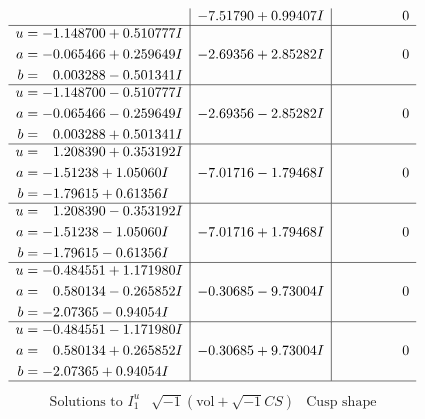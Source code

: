 \documentclass[1p]{elsarticle_modified}
\theoremstyle{definition}
\newcommand{\I}{\sqrt{-1}}
\begin{document}
$$\begin{array}{c|c|c}
 & -7.51790 + 0.99407 I & \phantom{-0.000000 } 0 \\ \hline\begin{aligned}
u &= -1.148700 + 0.510777 I \\
a &= -0.065466 + 0.259649 I \\
b &= \phantom{-}0.003288 - 0.501341 I\end{aligned}
 & -2.69356 + 2.85282 I & \phantom{-0.000000 } 0 \\ \hline\begin{aligned}
u &= -1.148700 - 0.510777 I \\
a &= -0.065466 - 0.259649 I \\
b &= \phantom{-}0.003288 + 0.501341 I\end{aligned}
 & -2.69356 - 2.85282 I & \phantom{-0.000000 } 0 \\ \hline\begin{aligned}
u &= \phantom{-}1.208390 + 0.353192 I \\
a &= -1.51238 + 1.05060 I \\
b &= -1.79615 + 0.61356 I\end{aligned}
 & -7.01716 - 1.79468 I & \phantom{-0.000000 } 0 \\ \hline\begin{aligned}
u &= \phantom{-}1.208390 - 0.353192 I \\
a &= -1.51238 - 1.05060 I \\
b &= -1.79615 - 0.61356 I\end{aligned}
 & -7.01716 + 1.79468 I & \phantom{-0.000000 } 0 \\ \hline\begin{aligned}
u &= -0.484551 + 1.171980 I \\
a &= \phantom{-}0.580134 - 0.265852 I \\
b &= -2.07365 - 0.94054 I\end{aligned}
 & -0.30685 - 9.73004 I & \phantom{-0.000000 } 0 \\ \hline\begin{aligned}
u &= -0.484551 - 1.171980 I \\
a &= \phantom{-}0.580134 + 0.265852 I \\
b &= -2.07365 + 0.94054 I\end{aligned}
 & -0.30685 + 9.73004 I & \phantom{-0.000000 } 0\\
 \hline 
 \end{array}$$\newpage$$\begin{array}{c|c|c}  
\text{Solutions to }I^u_{1}& \I (\text{vol} + \sqrt{-1}CS) & \text{Cusp shape}\\

\end{array}$$
\end{document}
